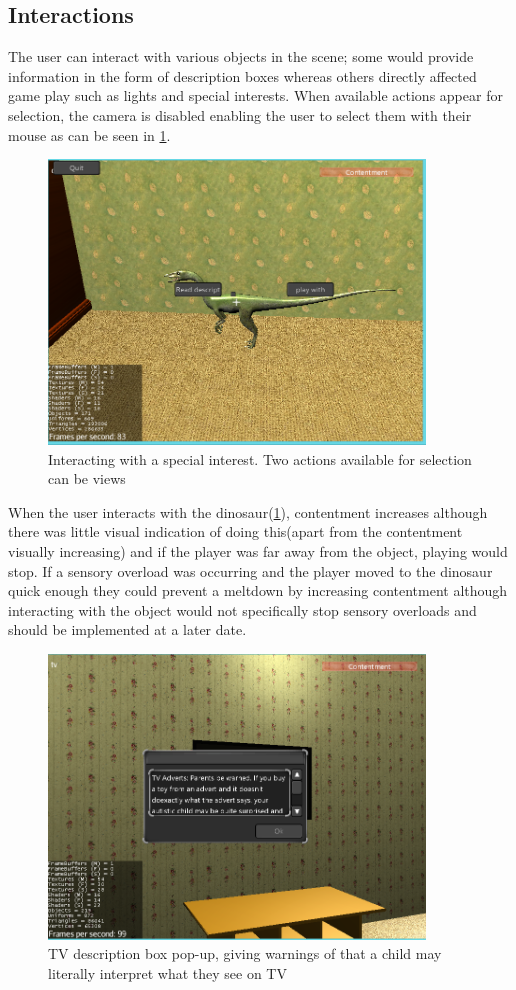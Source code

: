 \documentclass[11pt]{report}
\begin{document}
\subsection*{Interactions}

The user can interact with various objects in the scene; some would provide information in the form of description boxes whereas others directly affected game play such as lights and special interests. When available actions appear for selection, the camera is disabled enabling the user to select them with their mouse as can be seen in \ref{prototype_dino}.

\begin{figure}[H]
\centering
\includegraphics[width=100mm]{images/prototype/si.png}
\caption{Interacting with a special interest. Two actions available for selection can be views}
\label{prototype_dino}
\end{figure}

When the user interacts with the dinosaur(\ref{prototype_dino}), contentment increases although there was little visual indication of doing this(apart from the contentment visually increasing) and if the player was far away from the object, playing would stop. If a sensory overload was occurring and the player moved to the dinosaur quick enough they could prevent a meltdown by increasing contentment although interacting with the object would not specifically stop sensory overloads and should be implemented at a later date. 

\begin{figure}[H]
\centering
\includegraphics[width=100mm]{images/prototype/tvdescription.png}
\caption{TV description box pop-up, giving warnings of that a child may literally interpret what they see on TV }
\label{prototype_tvdesc}
\end{figure}
\end{document}
